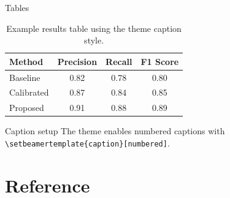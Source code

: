 \documentclass[aspectratio=169,10pt]{beamer}
\begin{document}
\begin{academicframe}{Tables}
  \begin{table}
    \centering
    \caption{Example results table using the theme caption style.}
    \begin{tabular}{lccc}
      \toprule
      Method & Precision & Recall & F1 Score \\
      \midrule
      Baseline & 0.82 & 0.78 & 0.80 \\
      Calibrated & 0.87 & 0.84 & 0.85 \\
      Proposed & 0.91 & 0.88 & 0.89 \\
      \bottomrule
    \end{tabular}
  \end{table}

  \vspace{0.4em}
  \begin{exampleblock}{Caption setup}
    \small
    The theme enables numbered captions with
    \texttt{\textbackslash setbeamertemplate\{caption\}[numbered]}.
  \end{exampleblock}
\end{academicframe}

\section{Reference}
\end{document}
